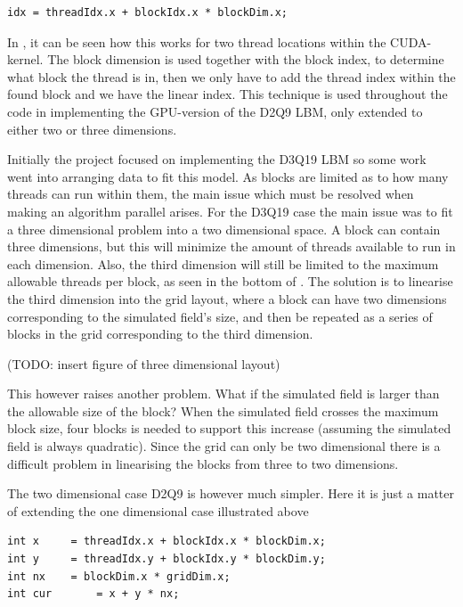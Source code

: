 \begin{verbatim}
idx = threadIdx.x + blockIdx.x * blockDim.x;
\end{verbatim}

In , it can be seen how this works for two thread locations within the CUDA-kernel. The block dimension is used together with the block index, to determine what block the thread is in, then we only have to add the thread index within the found block and we have the linear index. This technique is used throughout the code in implementing the GPU-version of the D2Q9 LBM, only extended to either two or three dimensions.


Initially the project focused on implementing the D3Q19 LBM so some work went into arranging data to fit this model. As blocks are limited as to how many threads can run within them, the main issue which must be resolved when making an algorithm parallel arises. For the D3Q19 case the main issue was to fit a three dimensional problem into a two dimensional space. A block can contain three dimensions, but this will minimize the amount of threads available to run in each dimension. Also, the third dimension will still be limited to the maximum allowable threads per block, as seen in the bottom of . The solution is to linearise the third dimension into the grid layout, where a block can have two dimensions corresponding to the simulated field's size, and then be repeated as a series of blocks in the grid corresponding to the third dimension.

(TODO: insert figure of three dimensional layout)

This however raises another problem. What if the simulated field is larger than the allowable size of the block? When the simulated field crosses the maximum block size, four blocks is needed to support this increase (assuming the simulated field is always quadratic). Since the grid can only be two dimensional there is a difficult problem in linearising the blocks from three to two dimensions.

The two dimensional case D2Q9 is however much simpler. Here it is just a matter of extending the one dimensional case illustrated above

\begin{verbatim}
int x     = threadIdx.x + blockIdx.x * blockDim.x;
int y     = threadIdx.y + blockIdx.y * blockDim.y;
int nx    = blockDim.x * gridDim.x;
int cur 	  = x + y * nx;
\end{verbatim}

